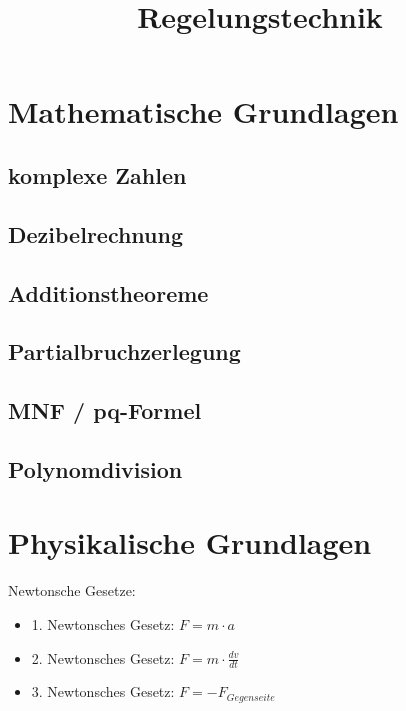 \documentclass[german]{latex4ei/latex4ei_sheet}
\title{Regelungstechnik}
\begin{document}
\section{Mathematische Grundlagen}
\begin{sectionbox}
    \subsection{komplexe Zahlen}

    \subsection{Dezibelrechnung}

    \subsection{Additionstheoreme}


    \subsection{Partialbruchzerlegung}


    \subsection{MNF / pq-Formel}


    \subsection{Polynomdivision}
\end{sectionbox}

\section{Physikalische Grundlagen}
\begin{sectionbox}
    Newtonsche Gesetze:
    \begin{itemize}
        \item 1. Newtonsches Gesetz: $F = m \cdot a$ \\
        \item 2. Newtonsches Gesetz: $F = m \cdot \frac{dv}{dt}$ \\
        \item 3. Newtonsches Gesetz: $F = -F_{Gegenseite}$ \\
    \end{itemize}
\end{sectionbox}
\end{document}
